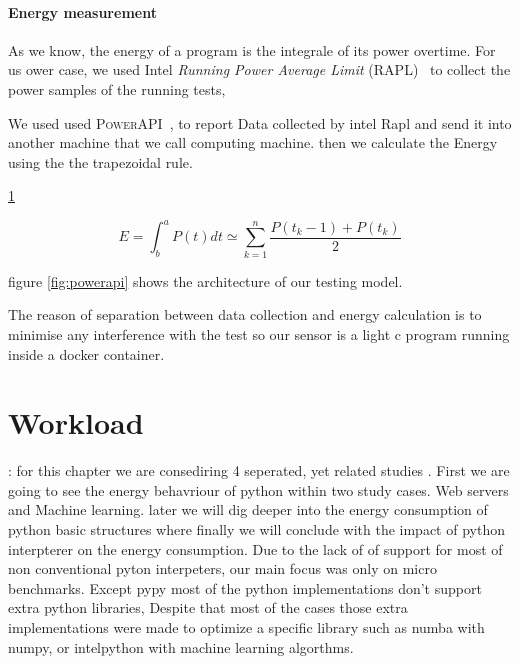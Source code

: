 \newpage

\paragraph{Energy measurement}

As we know, the energy of a program is the integrale of its power overtime. For us ower case, we used Intel \emph{Running Power Average Limit} (RAPL)~\cite{Khan:2018:RAE:3199681.3177754} to collect the power samples of the running tests,

We used used \textsc{PowerAPI}~\cite{DBLP:journals/jss/ColmantRKSFS18}, to report Data collected by intel Rapl and send it into another machine that we call computing machine. then we calculate the Energy using  the the trapezoidal rule.


\ref{fig:trapezrule}
\begin{figure}[hbt]
    \centering
    \begin{equation}
        E = \int^a_b P(t)dt \simeq \sum^n_{k=1} \frac{P(t_k-1)+P(t_k)}{2}
    \end{equation}
    \caption{}
    \label{fig:trapezrule}
\end{figure}



figure \ref{fig:powerapi} shows the architecture of our testing model.


The reason of separation between data collection and energy calculation is to minimise any interference with the test so our sensor is a light c program running inside a docker container.


\section{Workload} :
for this chapter we are consediring 4 seperated, yet related studies .
First we are going to see the energy behavriour of python within two study cases. Web servers and Machine learning. later we will dig deeper into the energy consumption of python basic structures where finally we will conclude with the impact of python interpterer on the energy consumption.
Due to the lack of of support for most of  non conventional pyton interpeters, our main focus was only on micro benchmarks.
Except pypy most of the python implementations don't support extra python libraries, Despite that most of the cases those extra implementations were made to optimize a specific library such as numba with numpy, or intelpython with machine learning algorthms.

